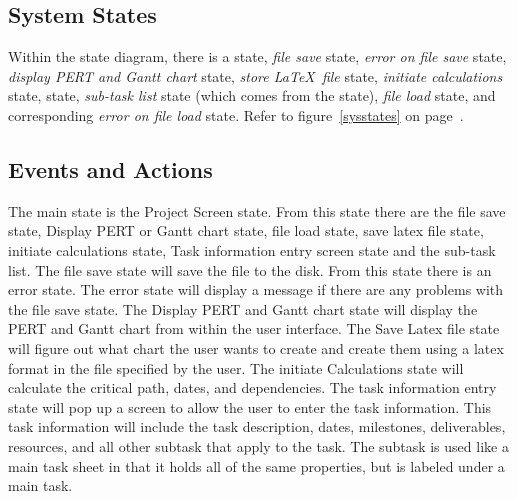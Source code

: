 \subsection{System States}

Within the state diagram, there is a \pscreen\/ state, {\em file
save}\/ state, {\em error on file save}\/ state, {\em display PERT and
Gantt chart}\/ state, {\em store \LaTeX\ file}\/ state, {\em initiate
calculations}\/ state, \tiscreen\/ state, {\em sub-task list}\/ state
(which comes from the \tiscreen\/ state), {\em file load}\/ state, and 
corresponding {\em error on file load}\/ state.  Refer to
figure~\ref{sysstates} on page~\pageref{sysstates}.

\subsection{Events and Actions}

The main state is the Project Screen state. From this state there are
the file save state, Display PERT or Gantt chart state, file load
state, save latex file state, initiate calculations state, Task
information entry screen state and the sub-task list. The file save
state will save the file to the disk. From this state there is an
error state. The error state will display a message if there are any
problems with the file save state. The Display PERT and Gantt chart
state will display the PERT and Gantt chart from within the user
interface. The Save Latex file state will figure out what chart the
user wants to create and create them using a latex format in the file
specified by the user. The initiate Calculations state will calculate
the critical path, dates, and dependencies. The task information entry
state will pop up a screen to allow the user to enter the task
information. This task information will include the task description,
dates, milestones, deliverables, resources, and all other subtask that
apply to the task. The subtask is used like a main task sheet in that
it holds all of the same properties, but is labeled under a main task.


%
%
